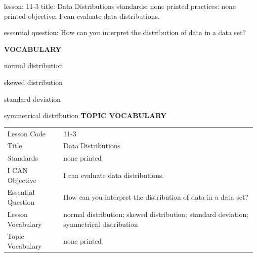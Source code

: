 \documentclass{article}
\newenvironment{lesson-meta}{}{}        %
\newcommand{\te}[1]{}                   %
\begin{document}
\begin{lesson-meta}
lesson: 11-3
title: Data Distributions
standards: none printed
practices: none printed
objective: I can evaluate data distributions.

essential question: How can you interpret the distribution of data in a data set?

\textbf{VOCABULARY}
\item normal distribution
\item skewed distribution
\item standard deviation
\item symmetrical distribution
\textbf{TOPIC VOCABULARY}
\te{No separate topic vocabulary list is printed on these pages.}
\begin{tabular}{ll}
Lesson Code & 11-3 \\
Title & Data Distributions \\
Standards & none printed \\
I CAN Objective & I can evaluate data distributions. \\
Essential Question & How can you interpret the distribution of data in a data set? \\
Lesson Vocabulary & normal distribution; skewed distribution; standard deviation; symmetrical distribution \\
Topic Vocabulary & none printed \\
\end{tabular}
\end{lesson-meta}
\end{document}
